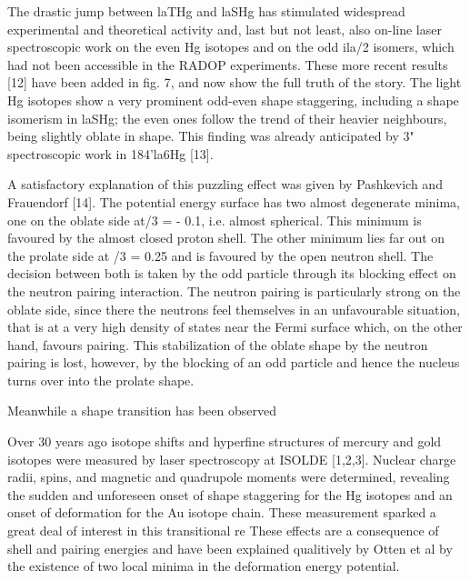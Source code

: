 The drastic jump between laTHg and laSHg has stimulated widespread experimental
and theoretical activity and, last but not least, also on-line laser spectroscopic
work on the even Hg isotopes and on the odd ila/2 isomers, which had not been
accessible in the RADOP experiments. These more recent results [12] have been
added in fig. 7, and now show the full truth of the story. The light Hg isotopes show a
very prominent odd-even shape staggering, including a shape isomerism in laSHg; the
even ones follow the trend of their heavier neighbours, being slightly oblate in shape.
This finding was already anticipated by 3" spectroscopic work in 184'la6Hg [13]. 

A satisfactory explanation of this puzzling effect was given by Pashkevich
and Frauendorf [14]. The potential energy surface has two almost degenerate minima,
one on the oblate side at/3 = - 0.1, i.e. almost spherical. This minimum is favoured
by the almost closed proton shell. The other minimum lies far out on the prolate side
at /3 = 0.25 and is favoured by the open neutron shell. The decision between both is
taken by the odd particle through its blocking effect on the neutron pairing interaction.
The neutron pairing is particularly strong on the oblate side, since there the
neutrons feel themselves in an unfavourable situation, that is at a very high density
of states near the Fermi surface which, on the other hand, favours pairing. This stabilization
of the oblate shape by the neutron pairing is lost, however, by the blocking of
an odd particle and hence the nucleus turns over into the prolate shape. 



Meanwhile a shape transition has been observed

Over 30 years ago isotope shifts and hyperfine structures of mercury and gold isotopes were measured by laser spectroscopy at ISOLDE [1,2,3]. Nuclear charge radii, spins, and magnetic and quadrupole moments were determined, revealing the sudden and unforeseen onset of shape staggering for the Hg isotopes and an onset of deformation for the Au isotope chain.  These measurement sparked a great deal of interest in this transitional re
These effects are a consequence of shell and pairing energies and have been explained qualitively by Otten et al by the existence of two local minima in the deformation energy potential.

